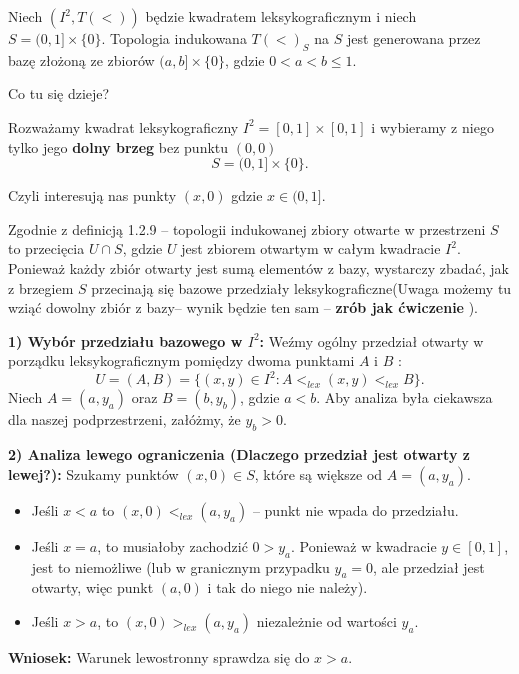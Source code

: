 \begin{eg}[1.2.10]
	Niech $\left( I^2,T\left( < \right)  \right) $ będzie kwadratem leksykograficznym i niech $S = (0,1] \times \{0\} $. Topologia indukowana $T\left( < \right)_{S}$ na $S$ jest generowana przez bazę złożoną ze zbiorów $(a,b]\times \{0\} $, gdzie $0<a<b\le 1$.

\noindent Co tu się dzieje?

Rozważamy kwadrat leksykograficzny $I^2 = \left[ 0,1 \right] \times \left[ 0,1 \right] $ i wybieramy z niego tylko jego \textbf{dolny brzeg} bez punktu $\left( 0,0 \right) $ 
\[
	S = (0,1] \times \{0\} 
.\] 

Czyli interesują nas punkty $\left( x,0 \right) $ gdzie $x \in (0,1]$.

\noindent Zgodnie z definicją 1.2.9 -- topologii indukowanej zbiory otwarte w przestrzeni $S$ to  przecięcia $U\cap S$, gdzie $U$ jest zbiorem otwartym w całym kwadracie $I^2$. Ponieważ każdy zbiór otwarty jest sumą elementów z bazy, wystarczy zbadać, jak z brzegiem $S$ przecinają się bazowe przedziały leksykograficzne(Uwaga możemy tu wziąć dowolny zbiór z bazy-- wynik będzie ten sam -- \textbf{zrób jak ćwiczenie} ).

\noindent \textbf{1) Wybór przedziału bazowego w $I^2$:} Weźmy ogólny przedział otwarty w porządku leksykograficznym pomiędzy dwoma punktami $A$ i $B$ :
\[
U = \left( A,B \right) = \{\left( x,y \right) \in I^2: A <_{lex} \left( x,y \right) <_{lex} B\} 
.\] 
Niech $A = \left( a, y_{a} \right) $ oraz $B = \left( b, y_{b} \right) $, gdzie $a<b$. Aby analiza była ciekawsza dla naszej podprzestrzeni, załóżmy, że $y_{b}>0$. 

\noindent \textbf{2) Analiza lewego ograniczenia (Dlaczego przedział jest otwarty z lewej?):} Szukamy punktów $\left( x,0 \right) \in S$, które są większe od $A = \left( a, y_{a} \right) $.
\begin{itemize}
	\item Jeśli $x<a$ to $\left( x,0 \right) <_{lex} \left( a, y_{a} \right) $ -- punkt nie wpada do przedziału.
	\item Jeśli $x = a$, to musiałoby zachodzić  $0> y_{a}$. Ponieważ w kwadracie $y \in \left[ 0,1 \right] $, jest to niemożliwe (lub w granicznym przypadku $y_{a} = 0$, ale przedział jest otwarty, więc punkt $\left( a,0 \right) $ i tak do niego nie należy).
	\item Jeśli $x>a$, to $\left( x,0 \right) >_{lex} \left( a, y_{a} \right) $ niezależnie od wartości $y_{a}$.
\end{itemize}
\noindent \textbf{Wniosek:} Warunek lewostronny sprawdza się do $x > a$.


\end{eg}
